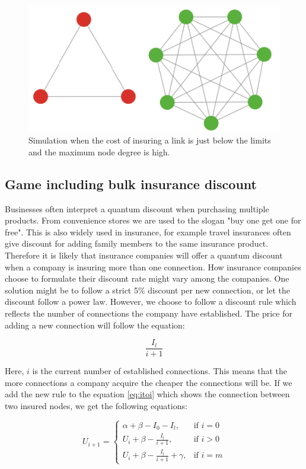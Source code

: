 \begin{figure}[h]
\centering
  \includegraphics[width=0.6\linewidth]{../Figures/BonusGameInsuredCliqueWithErrors.png}
  \caption{\label{fig:bonusviolatingWithErrors} Simulation when the cost of insuring a link is just below the limits and the maximum node degree is high. }
\end{figure}

\subsection{Game including bulk insurance discount}
Businesses often interpret a quantum discount when purchasing multiple products. From convenience stores we are used to the slogan "buy one get one for free". This is also widely used in insurance, for example travel insurances often give discount for adding family members to the same insurance product. Therefore it is likely that insurance companies will offer a quantum discount when a company is insuring more than one connection. How insurance companies choose to formulate their discount rate might vary among the companies. One solution might be to follow a strict 5$\%$ discount per new connection, or let the discount follow a power law. However, we choose to follow a discount rule which reflects the number of connections the company have established. 
The price for adding a new connection will follow the equation:

\begin{equation}
\frac{I_{l}}{i+1}
\label{eq:discount0}
\end{equation}

Here, $i$ is the current number of established connections. This means that the more connections a company acquire the cheaper the connections will be. 
If we add the new rule to the equation \ref{eq:itoi} which shows the connection between two insured nodes, we get the following equations: 

\begin{equation}
    U_{i+1}= 
\begin{cases}
    \alpha + \beta - I_{0} - I_{l},& \text{if } i = 0\\
    U_{i}+\beta -\frac{I_{l}}{i+1},& \text{if }  i>0\\
    U_{i}+\beta -\frac{I_{l}}{i+1}+\gamma,& \text{if } i=m
    
\end{cases}
\label{eq:discount1}
\end{equation}

